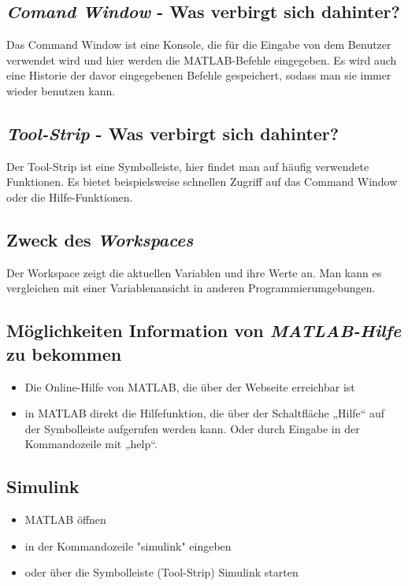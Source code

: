 \documentclass{article}
\begin{document}
		\subsection{\textit{Comand Window} - Was verbirgt sich dahinter?}
			Das Command Window ist eine Konsole, die für die Eingabe von dem Benutzer verwendet wird und hier werden die MATLAB-Befehle eingegeben. Es wird auch eine Historie der davor eingegebenen Befehle gespeichert, sodass man sie immer wieder benutzen kann. 
			
		\subsection{\textit{Tool-Strip} - Was verbirgt sich dahinter?}
			Der Tool-Strip ist eine Symbolleiste, hier findet man auf häufig verwendete Funktionen. Es bietet beispielsweise schnellen Zugriff auf das Command Window oder die Hilfe-Funktionen. 
		
		\subsection{Zweck des \textit{Workspaces}}
			Der Workspace zeigt die aktuellen Variablen und ihre Werte an. Man kann es vergleichen mit einer Variablenansicht in anderen Programmierumgebungen. 
		
		\subsection{Möglichkeiten Information von \textit{MATLAB-Hilfe} zu bekommen}
			\begin{itemize}
				\item Die Online-Hilfe von MATLAB, die über der Webseite erreichbar ist 
				\item in MATLAB direkt die Hilfefunktion, die über der Schaltfläche „Hilfe“ auf der Symbolleiste aufgerufen werden kann. Oder durch Eingabe in der Kommandozeile mit „help“. 
			\end{itemize}
		
		\subsection{Simulink}
			\begin{itemize}
				\item MATLAB öffnen
				\item in der Kommandozeile "simulink" eingeben
				\item oder über die Symbolleiste (Tool-Strip) Simulink starten
			\end{itemize}
		
\end{document}
